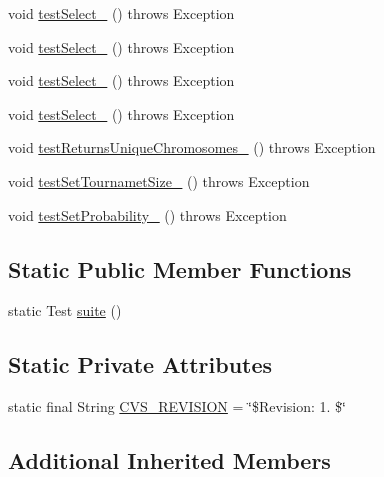 \begin{DoxyCompactItemize}
\item 
void \hyperlink{classorg_1_1jgap_1_1impl_1_1_tournament_selector_test_afde87b759a9ba5a68562bc3e08436159}{test\-Select\-\_} ()  throws Exception 
\item 
void \hyperlink{classorg_1_1jgap_1_1impl_1_1_tournament_selector_test_a791614dc5772d21c06a892de048ebdcc}{test\-Select\-\_} ()  throws Exception 
\item 
void \hyperlink{classorg_1_1jgap_1_1impl_1_1_tournament_selector_test_a6d20e602c513bde6b55200edabfc96e9}{test\-Select\-\_} ()  throws Exception 
\item 
void \hyperlink{classorg_1_1jgap_1_1impl_1_1_tournament_selector_test_a2a8b17596b01c80d7f1cb69dd41a0fef}{test\-Select\-\_} ()  throws Exception 
\item 
void \hyperlink{classorg_1_1jgap_1_1impl_1_1_tournament_selector_test_a39392510d4cc395ea8cdf0b32079d663}{test\-Returns\-Unique\-Chromosomes\-\_} ()  throws Exception 
\item 
void \hyperlink{classorg_1_1jgap_1_1impl_1_1_tournament_selector_test_a7d0761ec4c26fa2a8e33a47a87eeb286}{test\-Set\-Tournamet\-Size\-\_} ()  throws Exception 
\item 
void \hyperlink{classorg_1_1jgap_1_1impl_1_1_tournament_selector_test_a9e423c57bf5d7526e00648eb32222026}{test\-Set\-Probability\-\_} ()  throws Exception 
\end{DoxyCompactItemize}
\subsection*{Static Public Member Functions}
\begin{DoxyCompactItemize}
\item 
static Test \hyperlink{classorg_1_1jgap_1_1impl_1_1_tournament_selector_test_a50694e62fc7645bb1b90f7baa1a03db2}{suite} ()
\end{DoxyCompactItemize}
\subsection*{Static Private Attributes}
\begin{DoxyCompactItemize}
\item 
static final String \hyperlink{classorg_1_1jgap_1_1impl_1_1_tournament_selector_test_acaae2e63afd5cc87e019ce6f02416d76}{C\-V\-S\-\_\-\-R\-E\-V\-I\-S\-I\-O\-N} = \char`\"{}\$Revision\-: 1. \$\char`\"{}
\end{DoxyCompactItemize}
\subsection*{Additional Inherited Members}


